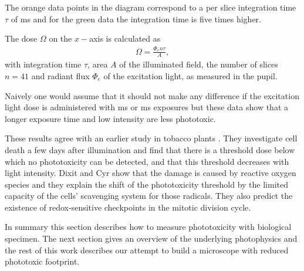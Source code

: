 The orange data points in the diagram correspond to a per slice
integration time $\tau$ of \unit[100]{ms} and for the green data
the integration time is five times higher.

The dose $\Omega$ on the $x-$axis is calculated as
\begin{align}
\Omega = \frac{\Phi_e n \tau}{A},
\end{align}
with integration time $\tau$, area $A$ of the illuminated field, the
number of slices $n=41$ and radiant flux $\Phi_e$ of the excitation
light, as measured in the pupil.

Naively one would assume that it should not make any difference if the
excitation light dose is administered with \unit[100]{ms} or
\unit[500]{ms} exposures but these data show that a longer exposure
time and low intensity are less phototoxic.

These results agree with an earlier study in tobacco plants
\citep{Dixit2003}. They investigate cell death a few days after
illumination and find that there is a threshold dose below which no
phototoxicity can be detected, and that this threshold decreases with
light intensity. Dixit and Cyr show that the damage is caused by
reactive oxygen species and they explain the shift of the
phototoxicity threshold by the limited capacity of the cells'
scavenging system for those radicals. They also predict the existence
of redox-sensitive checkpoints in the mitotic division cycle.


In summary this section describes how to measure phototoxicity with
biological specimen.  The next section gives an overview of the
underlying photophysics and the rest of this work describes our
attempt to build a microscope with reduced phototoxic footprint.



